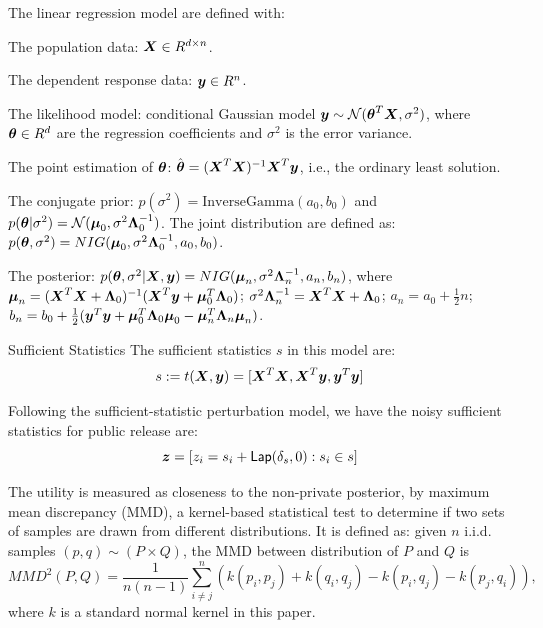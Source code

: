 \documentclass{article}
\begin{document}
%
\begin{defn}
The linear regression model are defined with:

The population data: $\boldsymbol{X} \in R^{d \times n}$.

The dependent response data: $\boldsymbol{y} \in R^{n}$.

The likelihood model: conditional Gaussian model 
$\boldsymbol{y} \sim \mathcal{N}(\boldsymbol{\theta}^{T} \boldsymbol{X}, \sigma^2)$,
where $\boldsymbol{\theta} \in R^d$ are the regression coefficients and
$\sigma^2$ is the error variance.

The point estimation of $\boldsymbol{\theta}$: 
$\hat{\boldsymbol{\theta}} = (\boldsymbol{X}^T \boldsymbol{X})^{-1} \boldsymbol{X}^T \boldsymbol{y}$, 
i.e., the ordinary least solution.

The conjugate prior: $p(\sigma^2) = \text{InverseGamma}(a_0, b_0 )$ 
and $p(\boldsymbol{\theta} | \sigma^2) = \mathcal{N} (\boldsymbol{\mu}_0 , \sigma^2\boldsymbol{\Lambda}_0^{-1})$. 
The joint distribution are defined as:
$p(\boldsymbol{\theta}, \sigma^2) = NIG(\boldsymbol{\mu}_0, \sigma^2\boldsymbol{\Lambda}_0^{-1}, a_0, b_0)$.

The posterior: 
$p(\boldsymbol{\theta}, \sigma^2 | \boldsymbol{X}, \boldsymbol{y}) = 
NIG (\boldsymbol{\mu}_n, \sigma^2\boldsymbol{\Lambda}_n^{-1}, a_n, b_n)$, where 
$\boldsymbol{\mu}_n = (\boldsymbol{X}^T \boldsymbol{X} + \boldsymbol{\Lambda}_0)^{-1}
(\boldsymbol{X}^T \boldsymbol{y} + \boldsymbol{\mu}_0^{T}\boldsymbol{\Lambda}_0)$;
$\sigma^2\boldsymbol{\Lambda}_n^{-1} = \boldsymbol{X}^T \boldsymbol{X} + \boldsymbol{\Lambda}_0$;
$a_n = a_0 + \frac{1}{2}n$;
$b_n = b_0 + \frac{1}{2}(\boldsymbol{y}^T\boldsymbol{y} 
+ \boldsymbol{\mu}_0^{T}\boldsymbol{\Lambda}_0 \boldsymbol{\mu}_0
- \boldsymbol{\mu}_n^{T}\boldsymbol{\Lambda}_n \boldsymbol{\mu}_n)$.
\end{defn}

\begin{defn}{Sufficient Statistics}
The sufficient statistics $s$ in this model are:
\[
	s := t(\boldsymbol{X}, \boldsymbol{y}) = [\boldsymbol{X}^T \boldsymbol{X}, \boldsymbol{X}^T \boldsymbol{y}, \boldsymbol{y}^T\boldsymbol{y}]
\]
\end{defn}

\begin{defn}
Following the sufficient-statistic perturbation model, we have the noisy sufficient statistics for public release are:
\[
	\boldsymbol{z} = [z_i = s_i + \mathsf{Lap}(\delta_s, 0) : s_i \in s]
\]
\end{defn}


\begin{defn}
The utility is measured as closeness to the non-private posterior, by maximum mean discrepancy (MMD), a kernel-based statistical test to determine if two sets of samples are drawn from different distributions. It is defined as: given $n$ i.i.d. samples $(p, q) \sim (P \times Q)$, the MMD between distribution of $P$ and $Q$ is
\[
	MMD^2(P, Q) = \frac{1}{n(n - 1)}
	\sum_{i \neq j}^{n}
	(k(p_i, p_j ) + k(q_i, q_j ) 
	- k(p_i, q_j ) - k(p_j , q_i)),
\]
where $k$ is a standard normal kernel in this paper.
\end{defn}
%
%
\end{document}
